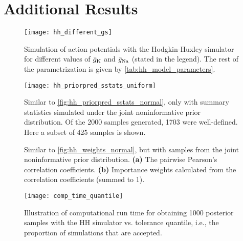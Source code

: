 \chapter{Additional Results}\label{sec:Appendix A}


\begin{figure}[H]
    \centering
    \texttt{[image: hh\_different\_gs]}
    \caption{Simulation of action potentials with the Hodgkin-Huxley simulator for different values of $\bar{g}_{\mathrm{K}}$ and $\bar{g}_{\mathrm{Na}}$ (stated in the legend). The rest of the parametrization is given by \autoref{tab:hh_model_parameters}.
    }
\end{figure}


\begin{figure}[H]
    \centering
    \texttt{[image: hh\_priorpred\_sstats\_uniform]}
    \caption{Similar to \autoref{fig:hh_priorpred_sstats_normal}, only with summary statistics simulated under the joint noninformative prior distribution. Of the 2000 samples generated, 1703 were well-defined. Here a subset of 425 samples is shown.}
\end{figure} 

\begin{figure}[H]
\centering
{}
\qquad
{}
\caption{Similar to \autoref{fig:hh_weights_normal}, but with samples from the joint noninformative prior distribution. \textbf{(a)} The pairwise Pearson's correlation coefficients. \textbf{(b)} Importance weights calculated from the correlation coefficients (summed to 1).
}
\end{figure}


 


\begin{figure}[H]
    \centering
    \texttt{[image: comp\_time\_quantile]}
    \caption{Illustration of computational run time for obtaining 1000 posterior samples with the HH simulator vs. tolerance quantile, i.e., the proportion of simulations that are accepted.}
    \label{fig:runtime}
\end{figure}

